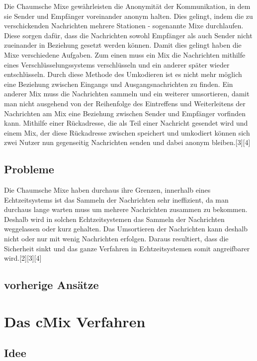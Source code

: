 \documentclass[
    fontsize=12pt,
    headings=small,
    parskip=half,           %
    bibliography=totoc,
    numbers=noenddot,       %
    open=any,               %
    ]{scrreprt}
\begin{document}
Die Chaumsche Mixe gewährleisten die Anonymität der
Kommunikation, in dem sie Sender und Empfänger voreinander anonym halten. Dies
gelingt, indem die zu verschickenden Nachrichten mehrere Stationen - sogenannte
Mixe durchlaufen. Diese sorgen dafür, dass die Nachrichten sowohl Empfänger als
auch Sender nicht zueinander in Beziehung gesetzt werden können. Damit dies
gelingt haben die Mixe verschiedene Aufgaben. 
Zum einen muss ein Mix die
Nachrichten mithilfe eines Verschlüsselungssystems verschlüsseln und ein anderer
später wieder entschlüsseln. Durch diese Methode des Umkodieren ist es nicht mehr
möglich eine Beziehung zwischen Eingangs und Ausgangsnachrichten zu finden. Ein
anderer Mix muss die Nachrichten sammeln und ein weiterer umsortieren, damit
man nicht ausgehend von der Reihenfolge des Eintreffens und Weiterleitens der
Nachrichten am Mix eine Beziehung zwischen Sender und Empfänger vorfinden
kann. Mithilfe einer Rückadresse, die als Teil einer Nachricht gesendet wird und
einem Mix, der diese Rückadresse zwischen speichert und umkodiert können sich
zwei Nutzer nun gegenseitig Nachrichten senden und dabei anonym bleiben.[3][4]

\section{Probleme}

Die Chaumsche Mixe haben durchaus ihre Grenzen, innerhalb eines Echtzeitsystems
ist das Sammeln der Nachrichten sehr ineffizient, da man durchaus lange warten
muss um mehrere Nachrichten zusammen zu bekommen. Deshalb wird in solchen
Echtzeitsystemen das Sammeln der Nachrichten weggelassen oder kurz gehalten.
Das Umsortieren der Nachrichten kann deshalb nicht oder nur mit wenig Nachrichten
erfolgen. Daraus resultiert, dass die Sicherheit sinkt und das ganze Verfahren in
Echtzeitsystemen somit angreifbarer wird.[2][3][4]

\section{vorherige Ansätze}

\chapter{Das cMix Verfahren}

\section{Idee}
\end{document}
